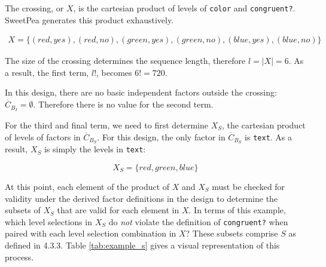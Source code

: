 The crossing, or $X$, is the cartesian product of levels of \texttt{color} and \texttt{congruent?}. SweetPea generates this product exhaustively.

\begin{align*}
X = \{(red, yes), (red, no), (green, yes), (green, no), (blue, yes), (blue, no)\}
\end{align*}

The size of the crossing determines the sequence length, therefore $l = |X| = 6$. As a result, the first term, $l!$, becomes $6! = 720$.

In this design, there are no basic independent factors outside the crossing: $\overline{C}_{B_I} = \emptyset$. Therefore there is no value for the second term.

For the third and final term, we need to first determine $X_S$, the cartesian product of levels of factors in $\overline{C}_{B_S}$. For this design, the only factor in $\overline{C}_{B_S}$ is \texttt{text}. As a result, $X_S$ is simply the levels in \texttt{text}:

\[
X_S = \{red, green, blue\}
\]

At this point, each element of the product of $X$ and $X_S$ must be checked for validity under the derived factor definitions in the design to determine the subsets of $X_S$ that are valid for each element in $X$. In terms of this example, which level selections in $X_S$ do \textit{not} violate the definition of \texttt{congruent?} when paired with each level selection combination in $X$? These subsets comprise $S$ as defined in 4.3.3. Table \ref{tab:example_s} gives a visual representation of this process.

